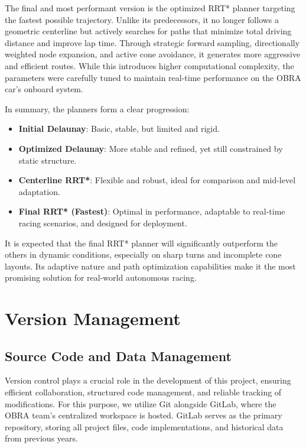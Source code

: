 \documentclass[a4paper,11pt]{report}
\begin{document}
The final and most performant version is the optimized RRT* planner targeting the fastest possible trajectory. Unlike its predecessors, it no longer follows a geometric centerline but actively searches for paths that minimize total driving distance and improve lap time. Through strategic forward sampling, directionally weighted node expansion, and active cone avoidance, it generates more aggressive and efficient routes. While this introduces higher computational complexity, the parameters were carefully tuned to maintain real-time performance on the OBRA car's onboard system.

In summary, the planners form a clear progression:
\begin{itemize}
    \item \textbf{Initial Delaunay}: Basic, stable, but limited and rigid.
    \item \textbf{Optimized Delaunay}: More stable and refined, yet still constrained by static structure.
    \item \textbf{Centerline RRT*}: Flexible and robust, ideal for comparison and mid-level adaptation.
    \item \textbf{Final RRT* (Fastest)}: Optimal in performance, adaptable to real-time racing scenarios, and designed for deployment.
\end{itemize}

It is expected that the final RRT* planner will significantly outperform the others in dynamic conditions, especially on sharp turns and incomplete cone layouts. Its adaptive nature and path optimization capabilities make it the most promising solution for real-world autonomous racing.

\newpage


\chapter {Version Management}

\section{Source Code and Data Management}

Version control plays a crucial role in the development of this project, ensuring efficient collaboration, structured code management, and reliable tracking of modifications. For this purpose, we utilize Git alongside GitLab, where the OBRA team's centralized workspace is hosted. GitLab serves as the primary repository, storing all project files, code implementations, and historical data from previous years.
\end{document}
